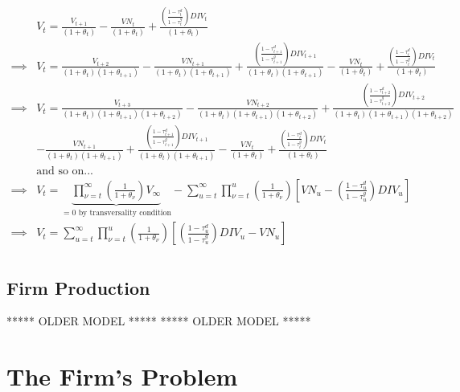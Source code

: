\begin{equation}
\label{eqn:solve_vs}
\begin{split}
& V_{t}=\frac{V_{t+1}}{(1+\theta_{t})} - \frac{VN_{t}}{(1+\theta_{t})}  + \frac{\left(\frac{1-\tau^{d}_{t}}{1-\tau^{g}_{t}}\right)DIV_{t}}{(1+\theta_{t})} \\
\implies &  V_{t}=\frac{V_{t+2}}{(1+\theta_{t})(1+\theta_{t+1})} - \frac{VN_{t+1}}{(1+\theta_{t})(1+\theta_{t+1})}  + \frac{\left(\frac{1-\tau^{d}_{t+1}}{1-\tau^{g}_{t+1}}\right)DIV_{t+1}}{(1+\theta_{t})(1+\theta_{t+1})} - \frac{VN_{t}}{(1+\theta_{t})}  + \frac{\left(\frac{1-\tau^{d}_{t}}{1-\tau^{g}_{t}}\right)DIV_{t}}{(1+\theta_{t})} \\
\implies &  V_{t}= \frac{V_{t+3}}{(1+\theta_{t})(1+\theta_{t+1})(1+\theta_{t+2})} - \frac{VN_{t+2}}{(1+\theta_{t})(1+\theta_{t+1})(1+\theta_{t+2})}  + \frac{\left(\frac{1-\tau^{d}_{t+2}}{1-\tau^{g}_{t+2}}\right)DIV_{t+2}}{(1+\theta_{t})(1+\theta_{t+1})(1+\theta_{t+2})} \\
& - \frac{VN_{t+1}}{(1+\theta_{t})(1+\theta_{t+1})}  + \frac{\left(\frac{1-\tau^{d}_{t+1}}{1-\tau^{g}_{t+1}}\right)DIV_{t+1}}{(1+\theta_{t})(1+\theta_{t+1})} - \frac{VN_{t}}{(1+\theta_{t})}  + \frac{\left(\frac{1-\tau^{d}_{t}}{1-\tau^{g}_{t}}\right)DIV_{t}}{(1+\theta_{t})} \\
& \text{and so on...} \\
\implies & V_{t}=\underbrace{\prod_{\nu=t}^{\infty}\left(\frac{1}{1+\theta_{\nu}}\right)V_{\infty}}_{=0 \text{ by transversality condition}} - \sum_{u=t}^{\infty} \prod_{\nu=t}^{u}\left(\frac{1}{1+\theta_{\nu}}\right)\left[VN_{u} - \left(\frac{1-\tau^{d}_{u}}{1-\tau^{g}_{u}}\right)DIV_{u}\right]\\
\implies & V_{t}= \sum_{u=t}^{\infty} \prod_{\nu=t}^{u}\left(\frac{1}{1+\theta_{\nu}}\right)\left[ \left(\frac{1-\tau^{d}_{u}}{1-\tau^{g}_{u}}\right)DIV_{u}-VN_{u}\right]\\
\end{split}
\end{equation}

\subsection{Firm Production}



***** OLDER MODEL *****
***** OLDER MODEL *****

\section{The Firm's Problem}

